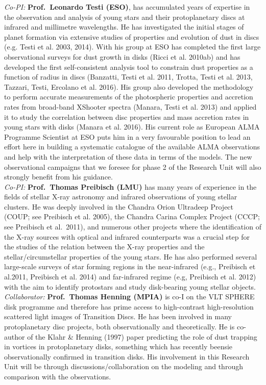 \documentclass[10pt,fleqn,twoside]{article}
\begin{document}
{\it Co-PI:} {\bf Prof.\ Leonardo Testi (ESO)},  has accumulated years of expertise
in the observation and analysis of young stars and their protoplanetary
discs at infrared and millimetre wavelengths. He has investigated the initial stages of planet formation via
extensive studies of properties and evolution of dust in discs (e.g. Testi et
al. 2003, 2014). With his group at ESO has completed the first large observational surveys for dust growth
in disks (Ricci et al. 2010ab) and has developed the first self-consistent analysis tool to constrain dust properties
as a function of radius in discs (Banzatti, Testi et al. 2011, Trotta,
Testi et al. 2013, Tazzari, Testi, Ercolano et al. 2016). His group also developed the methodology to perform accurate measurements of the photospheric properties and accretion rates from broad-band XShooter spectra (Manara, Testi et al. 2013) and applied it to study the correlation between disc properties and mass accretion rates in young stars with disks (Manara et al. 2016).
His current role as European ALMA Programme Scientist at ESO
puts him in a very favourable position to lead an effort here in
building a systematic catalogue of the available ALMA observations and help with the interpretation of these data in terms of
the models. The new observational
campaigns that we foresee for phase 2 of the Research Unit will also
strongly 
benefit from his guidance. \\

{\it Co-PI:} {\bf Prof.\ Thomas Preibisch (LMU)}  has many years of experience in the
fields of stellar X-ray astronomy and infrared observations
of young stellar clusters.
He was deeply involved in the
Chandra Orion Ultradeep Project (COUP;  see Preibisch et al. 2005),
the Chandra Carina Complex Project (CCCP; see Preibisch et al.~2011),
and numerous other projects where
the identification of the X-ray sources with optical
and infrared counterparts was a crucial step for the studies
of the relation between the X-ray properties and the stellar/circumstellar
properties of the young stars. He has also performed several large-scale surveys of star forming
regions in the near-infrared (e.g., Preibisch et al.2011,
Preibisch et al. 2014)
and far-infrared regime (e.g, Preibisch et al. 2012)
with the aim to identify protostars and study disk-bearing young
stellar objects.\\

{\it Collaborator:} {\bf Prof.\ Thomas Henning (MPIA)}  is co-I
on the VLT SPHERE disk programme and therefore has prime access to
high-contrast high-resolution scattered light images of Transition
Discs. He has been involved in many protoplanetary disc projects, both
observationally and theoretically. He is co-author of the Klahr \&
Henning (1997) paper predicting the role of dust trapping in vortices
in protoplanetary disks, something which has recently beensie 
observationally confirmed in transition disks. His involvement in this
Research Unit will be through discussions/collaboration on the
modeling and through comparison with the observations. \\
\end{document}
